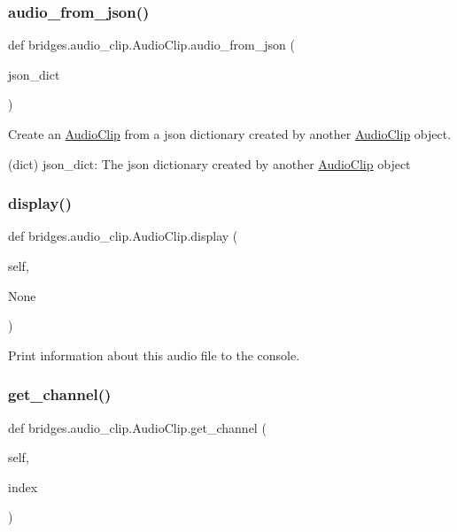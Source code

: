 \subsubsection{\texorpdfstring{audio\+\_\+from\+\_\+json()}{audio\_from\_json()}}
{\footnotesize\ttfamily def bridges.\+audio\+\_\+clip.\+Audio\+Clip.\+audio\+\_\+from\+\_\+json (\begin{DoxyParamCaption}\item[{}]{json\+\_\+dict }\end{DoxyParamCaption})}



Create an \hyperlink{classbridges_1_1audio__clip_1_1_audio_clip}{Audio\+Clip} from a json dictionary created by another \hyperlink{classbridges_1_1audio__clip_1_1_audio_clip}{Audio\+Clip} object. 

(dict) json\+\_\+dict\+: The json dictionary created by another \hyperlink{classbridges_1_1audio__clip_1_1_audio_clip}{Audio\+Clip} object \mbox{\label{classbridges_1_1audio__clip_1_1_audio_clip_aa6f7d21f1ab5296f8d0df267c12aea4a}} 
\subsubsection{\texorpdfstring{display()}{display()}}
{\footnotesize\ttfamily def bridges.\+audio\+\_\+clip.\+Audio\+Clip.\+display (\begin{DoxyParamCaption}\item[{}]{self,  }\item[{}]{None }\end{DoxyParamCaption})}



Print information about this audio file to the console. 

\mbox{\label{classbridges_1_1audio__clip_1_1_audio_clip_a9e322508117351585d6f3d22e2ccb3bc}} 
\subsubsection{\texorpdfstring{get\+\_\+channel()}{get\_channel()}}
{\footnotesize\ttfamily def bridges.\+audio\+\_\+clip.\+Audio\+Clip.\+get\+\_\+channel (\begin{DoxyParamCaption}\item[{}]{self,  }\item[{}]{index }\end{DoxyParamCaption})}



